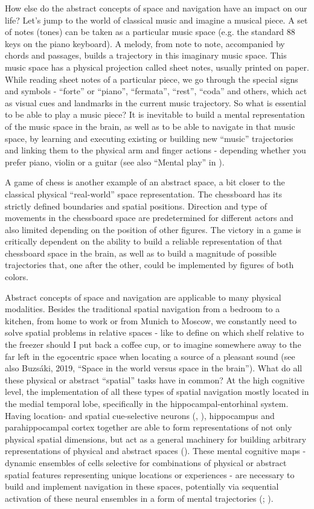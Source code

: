 How else do the abstract concepts of space and navigation have an impact on our life? Let’s jump to the world of classical music and imagine a musical piece. A set of notes (tones) can be taken as a particular music space (e.g. the standard 88 keys on the piano keyboard). A melody, from note to note, accompanied by chords and passages, builds a trajectory in this imaginary music space. This music space has a physical projection called sheet notes, usually printed on paper. While reading sheet notes of a particular piece, we go through the special signs and symbols - “forte” or “piano”, “fermata”, “rest”, “coda” and others, which act as visual cues and landmarks in the current music trajectory. So what is essential to be able to play a music piece? It is inevitable to build a mental representation of the music space in the brain, as well as to be able to navigate in that music space, by learning and executing existing or building new “music” trajectories and linking them to the physical arm and finger actions - depending whether you prefer piano, violin or a guitar (see also “Mental play” in \cite{ChuanChang2016}).

A game of chess is another example of an abstract space, a bit closer to the classical physical “real-world” space representation. The chessboard has its strictly defined boundaries and spatial positions. Direction and type of movements in the chessboard space are predetermined for different actors and also limited depending on the position of other figures. The victory in a game is critically dependent on the ability to build a reliable representation of that chessboard space in the brain, as well as to build a magnitude of possible trajectories that, one after the other, could be implemented by figures of both colors.

Abstract concepts of space and navigation are applicable to many physical modalities. Besides the traditional spatial navigation from a bedroom to a kitchen, from home to work or from Munich to Moscow, we constantly need to solve spatial problems in relative spaces - like to define on which shelf relative to the freezer should I put back a coffee cup, or to imagine somewhere away to the far left in the egocentric space when locating a source of a pleasant sound (see also Buzsáki, 2019, “Space in the world versus space in the brain”). What do all these physical or abstract “spatial” tasks have in common? At the high cognitive level, the implementation of all these types of spatial navigation mostly located in the medial temporal lobe, specifically in the hippocampal-entorhinal system. Having location- and spatial cue-selective neurons (\cite{OKeefe1978}, \cite{Moser2015}), hippocampus and parahippocampal cortex together are able to form representations of not only physical spatial dimensions, but act as a general machinery for building arbitrary representations of physical and abstract spaces (\cite{Aronov2017}). These  mental cognitive maps - dynamic ensembles of cells selective for combinations of physical or abstract spatial features representing unique locations or experiences - are necessary to build and implement navigation in these spaces, potentially via sequential activation of these neural ensembles in a form of mental trajectories (\cite{Hopfield2010}; \cite{Buzsaki2018}).

